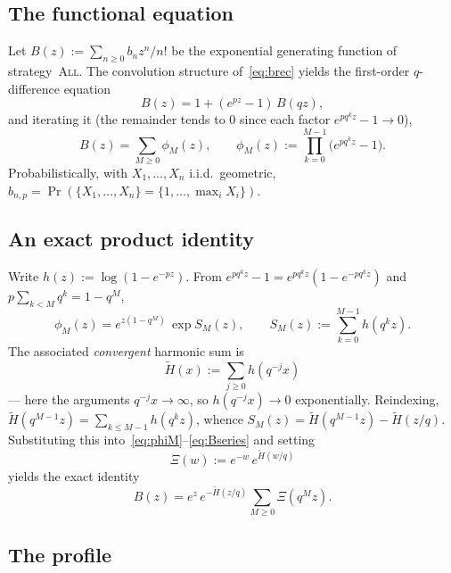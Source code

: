 \documentclass[11pt]{article}
\theoremstyle{definition}
\newcommand{\All}{\textsc{All}}
\begin{document}
\subsection{The functional equation}

Let $B(z):=\sum_{n\ge0}b_n z^n/n!$ be the exponential generating
function of strategy~\All. The convolution structure
of~\eqref{eq:brec} yields the first-order $q$-difference equation
\begin{equation}\label{eq:Bfunc}
  B(z)=1+(e^{pz}-1)\,B(qz),
\end{equation}
and iterating it (the remainder tends to $0$ since each factor
$e^{pq^kz}-1\to0$),
\begin{equation}\label{eq:Bseries}
  B(z)=\sum_{M\ge0}\phi_M(z),\qquad
  \phi_M(z):=\prod_{k=0}^{M-1}\bigl(e^{pq^kz}-1\bigr).
\end{equation}
Probabilistically, with $X_1,\dots,X_n$ i.i.d.\ geometric,
$b_{n,p}=\Pr(\{X_1,\dots,X_n\}=\{1,\dots,\max_iX_i\})$.

\subsection{An exact product identity}\label{sec:identity}

Write $h(z):=\log(1-e^{-pz})$. From $e^{pq^kz}-1=e^{pq^kz}
(1-e^{-pq^kz})$ and $p\sum_{k<M}q^k=1-q^M$,
\begin{equation}\label{eq:phiM}
  \phi_M(z)=e^{z(1-q^M)}\,\exp S_M(z),\qquad
  S_M(z):=\sum_{k=0}^{M-1}h(q^kz).
\end{equation}
The associated \emph{convergent} harmonic sum is
\begin{equation}\label{eq:Htilde}
  \tilde H(x):=\sum_{j\ge0}h(q^{-j}x)
\end{equation}
--- here the arguments $q^{-j}x\to\infty$, so $h(q^{-j}x)\to0$
exponentially. Reindexing, $\tilde H(q^{M-1}z)=\sum_{k\le M-1}
h(q^kz)$, whence $S_M(z)=\tilde H(q^{M-1}z)-\tilde H(z/q)$.
Substituting this into~\eqref{eq:phiM}--\eqref{eq:Bseries} and setting
\begin{equation}\label{eq:Xi}
  \Xi(w):=e^{-w}\,e^{\tilde H(w/q)}
\end{equation}
yields the exact identity
\begin{equation}\label{eq:Bidentity}
  B(z)=e^{z}\,e^{-\tilde H(z/q)}\sum_{M\ge0}\Xi(q^Mz).
\end{equation}

\subsection{The profile}\label{sec:profile}
\end{document}
